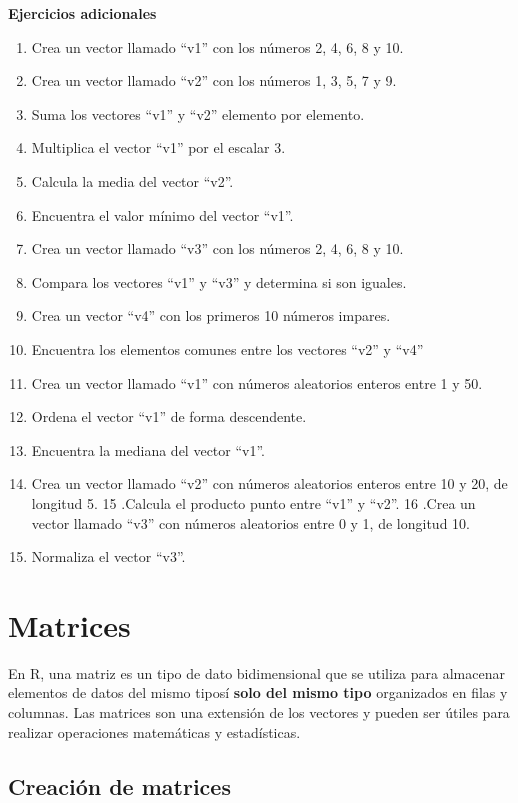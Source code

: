 \documentclass[
]{book}
\providecommand{\tightlist}{%
  \setlength{\itemsep}{0pt}\setlength{\parskip}{0pt}}
\begin{document}
\textbf{Ejercicios adicionales }

\begin{enumerate}
\def\labelenumi{\arabic{enumi}.}
\tightlist
\item
  Crea un vector llamado ``v1'' con los números 2, 4, 6, 8 y 10.
\item
  Crea un vector llamado ``v2'' con los números 1, 3, 5, 7 y 9.
\item
  Suma los vectores ``v1'' y ``v2'' elemento por elemento.
\item
  Multiplica el vector ``v1'' por el escalar 3.
\item
  Calcula la media del vector ``v2''.
\item
  Encuentra el valor mínimo del vector ``v1''.
\item
  Crea un vector llamado ``v3'' con los números 2, 4, 6, 8 y 10.
\item
  Compara los vectores ``v1'' y ``v3'' y determina si son iguales.
\item
  Crea un vector ``v4'' con los primeros 10 números impares.
\item
  Encuentra los elementos comunes entre los vectores ``v2'' y ``v4''
\item
  Crea un vector llamado ``v1'' con números aleatorios enteros entre 1 y 50.
\item
  Ordena el vector ``v1'' de forma descendente.
\item
  Encuentra la mediana del vector ``v1''.
\item
  Crea un vector llamado ``v2'' con números aleatorios enteros entre 10 y 20, de longitud 5.
  15 .Calcula el producto punto entre ``v1'' y ``v2''.
  16 .Crea un vector llamado ``v3'' con números aleatorios entre 0 y 1, de longitud 10.
\item
  Normaliza el vector ``v3''.
\end{enumerate}

\chapter{Matrices}\label{matrices}

En R, una matriz es un tipo de dato bidimensional que se utiliza para almacenar elementos de datos del mismo tiposí \textbf{solo del mismo tipo} organizados en filas y columnas.
Las matrices son una extensión de los vectores y pueden ser útiles para realizar operaciones matemáticas y estadísticas.

\section{Creación de matrices}\label{creaciuxf3n-de-matrices}
\end{document}
